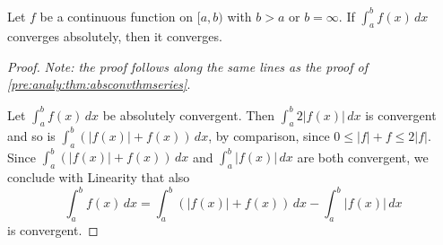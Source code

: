 \documentclass[10pt, a4paper]{article}
\begin{document}
\begin{theorem}
    Let $f$ be a continuous function on $[a, b)$ with $b > a$ or $b = \infty$.
    If $\int_{a}^{b}f(x)\,dx$ converges absolutely,
    then it converges.
    \begin{proof}
        \textit{Note: the proof follows along the same lines as the proof of \autoref{pre:analy:thm:absconvthmseries}}.

        Let $\int_{a}^{b}f(x)\,dx$ be absolutely convergent.
        Then $\int_{a}^{b}2|f(x)|\,dx$ is convergent and so is $\int_{a}^{b}(|f(x)| + f(x))\,dx$,
        by comparison,
        since $0 \leq |f| + f \leq 2|f|$.
        Since $\int_{a}^{b}(|f(x)| + f(x))\,dx$ and $\int_{a}^{b}|f(x)|\,dx$ are both convergent,
        we conclude with Linearity that also
        \[
        \int_{a}^{b}f(x)\,dx = \int_{a}^{b}(|f(x)| + f(x))\,dx - \int_{a}^{b}|f(x)|\,dx
        \]
        is convergent.
    \end{proof}
\end{theorem}
\end{document}
